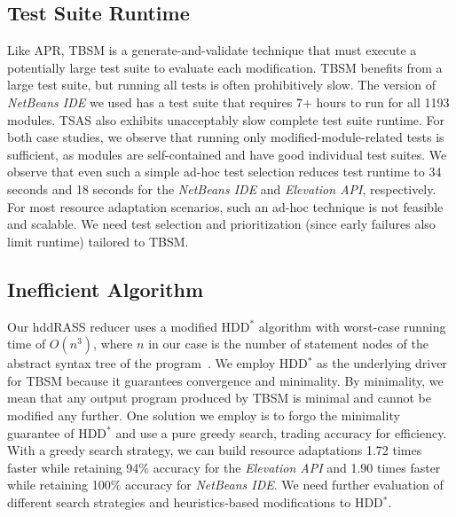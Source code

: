 \subsection{Test Suite Runtime }
Like APR, TBSM is a generate-and-validate technique that must execute a potentially large test suite to evaluate each modification. TBSM benefits from a large test suite, but running all tests is often prohibitively slow. The version of \textit{NetBeans IDE} we used has a test suite that requires 7+ hours to run for all 1193 modules. TSAS also exhibits unacceptably slow complete test suite runtime. For both case studies, we observe that running only modified-module-related tests is sufficient, as modules are self-contained and have good individual test suites. We observe that even such a simple ad-hoc test selection reduces test runtime to 34 seconds and 18 seconds for the \textit{NetBeans IDE} and \textit{Elevation API}, respectively. For most resource adaptation scenarios, such an ad-hoc technique is not feasible and scalable. We need test selection and prioritization (since early failures also limit runtime) tailored to TBSM.

\subsection{Inefficient Algorithm}
Our hddRASS reducer uses a modified HDD$^*$ algorithm with worst-case running time of $O(n^3)$, where $n$ in our case is the number of statement nodes of the abstract syntax tree of the program~\cite{misherghi2006hdd}. We employ HDD$^*$ as the underlying driver for TBSM because it guarantees convergence and minimality. By minimality, we mean that any output program produced by TBSM is minimal and cannot be modified any further. One solution we employ is to forgo the minimality guarantee of HDD$^*$ and use a pure greedy search, trading accuracy for efficiency.  With a greedy search strategy, we can build resource adaptations 1.72 times faster while retaining 94\% accuracy for the \textit{Elevation API} and 1.90 times faster while retaining 100\% accuracy for \textit{NetBeans IDE}. We need further evaluation of different search strategies and heuristics-based modifications to HDD$^*$.

